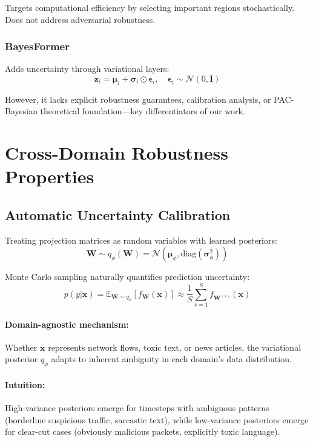 \documentclass[12pt,a4paper]{article}
\theoremstyle{definition}
\begin{document}
Targets computational efficiency by selecting important regions stochastically. Does not address adversarial robustness.

\subsubsection{BayesFormer \citep{sankararaman2022bayesformer}}

Adds uncertainty through variational layers:
\begin{equation}
\bm{z}_i = \bm{\mu}_i + \bm{\sigma}_i \odot \bm{\epsilon}_i, \quad \bm{\epsilon}_i \sim \mathcal{N}(0, \bm{I})
\end{equation}

However, it lacks explicit robustness guarantees, calibration analysis, or PAC-Bayesian theoretical foundation—key differentiators of our work.

\section{Cross-Domain Robustness Properties}
\label{app:robustness_properties}

\subsection{Automatic Uncertainty Calibration}

Treating projection matrices as random variables with learned posteriors:
\begin{equation}
\bm{W} \sim q_\phi(\bm{W}) = \mathcal{N}(\bm{\mu}_\phi, \text{diag}(\bm{\sigma}_\phi^2))
\end{equation}

Monte Carlo sampling naturally quantifies prediction uncertainty:
\begin{equation}
p(y|\bm{x}) = \mathbb{E}_{\bm{W} \sim q_\phi} [f_{\bm{W}}(\bm{x})] \approx \frac{1}{S}\sum_{s=1}^S f_{\bm{W}^{(s)}}(\bm{x})
\end{equation}

\paragraph{Domain-agnostic mechanism:} Whether $\bm{x}$ represents network flows, toxic text, or news articles, the variational posterior $q_\phi$ adapts to inherent ambiguity in each domain's data distribution.

\paragraph{Intuition:} High-variance posteriors emerge for timesteps with ambiguous patterns (borderline suspicious traffic, sarcastic text), while low-variance posteriors emerge for clear-cut cases (obviously malicious packets, explicitly toxic language).
\end{document}
